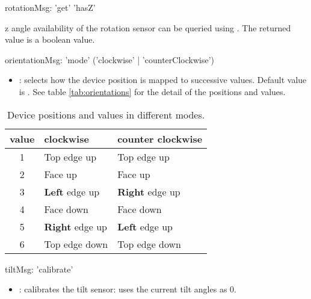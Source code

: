 
\begin{rail}
rotationMsg: 	'get' 'hasZ'
\end{rail}

z angle availability of the rotation sensor can be queried using . The returned value is a boolean value.

\label{Orientation}


\begin{rail}
orientationMsg: 	'mode' ('clockwise' | 'counterClockwise')
\end{rail}

\begin{itemize}
\item {}: selects how the device position is mapped to successive values. Default value is . See table \ref{tab:orientations} for the detail of the positions and values. 
\end{itemize}

\label{tab:orientations}

\begin{table*}[htbp]
\begin{center}
\begin{tabular}{cll}
\hline
value & clockwise	&	counter clockwise \\
\hline
1	& Top edge up	& Top edge up	\\
2	& Face up		& Face up		\\
3	& \textbf{Left} edge up	& \textbf{Right} edge up	\\
4	& Face down		& Face down		\\
5	& \textbf{Right} edge up & \textbf{Left} edge up 	\\
6	& Top edge down & Top edge down \\
\hline
\end{tabular}
\end{center}
\caption{Device positions and values in different modes.}
\end{table*}



\label{Tilt}


\begin{rail}
tiltMsg: 	'calibrate'
\end{rail}

\begin{itemize}
\item {}: calibrates the tilt sensor: uses the current tilt angles as 0. 
\end{itemize}

